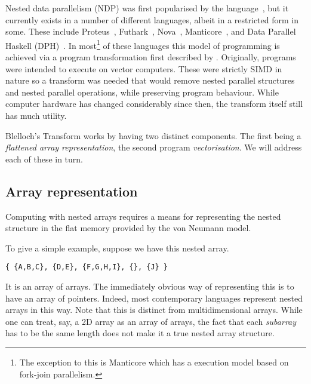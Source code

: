 Nested data parallelism (NDP) was first popularised by the \nesl{} language~\cite{Blelloch:nesl1995}, but it currently exists in a number of different languages, albeit in a restricted form in some. These include Proteus~\cite{proteus-frontiers95}, Futhark~\cite{Henriksen:2017futhark}, Nova~\cite{collins2013nova}, Manticore~\cite{Fluet:2007:manticore}, and Data Parallel Haskell (DPH)~\cite{Jones:2008uu}. In most\footnote{The exception to this is Manticore which has a execution model based on fork-join parallelism.} of these languages this model of programming is achieved via a program transformation first described by \citet{Blelloch:compiling1988}. Originally, \nesl{} programs were intended to execute on vector computers. These were strictly SIMD in nature so a transform was needed that would remove nested parallel structures and nested parallel operations, while preserving program behaviour. While computer hardware has changed considerably since then, the transform itself still has much utility.


Blelloch's Transform works by having two distinct components. The first being a \emph{flattened array representation}, the second program \emph{vectorisation}. We will address each of these in turn.

\subsection{Array representation}
\label{sec:background-representation}

Computing with nested arrays requires a means for representing the nested structure in the flat memory provided by the von Neumann model.

To give a simple example, suppose we have this nested array.
%
\begin{lstlisting}
{ {A,B,C}, {D,E}, {F,G,H,I}, {}, {J} }
\end{lstlisting}
%
It is an array of arrays. The immediately obvious way of representing this is to have an array of pointers. Indeed, most contemporary languages represent nested arrays in this way. Note that this is distinct from multidimensional arrays. While one can treat, say, a 2D array as an array of arrays, the fact that each \emph{subarray} has to be the same length does not make it a true nested array structure.

